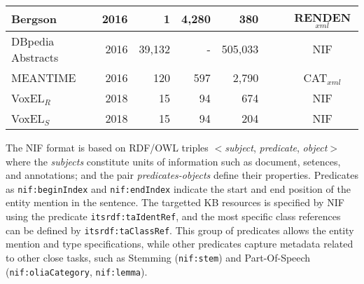 \documentclass{llncs}
\newcommand{\cmark}{\ding{51}}%
\newcommand{\xmark}{\ding{55}}%
\begin{document}
\begin{table}[tb!]
{\begin{tabular}{lrrrrccc}
Bergson~\cite{renden2016}           &2016&1       &4,280  &380     &\xmark &\cmark & RENDEN$_{xml}$\\\midrule
DBpedia Abstracts
~\cite{abstracts2016}               &2016&39,132  &-      &505,033 &\xmark &\xmark & NIF\\\midrule
MEANTIME~\cite{meantime2016}        &2016&120     &597    &2,790   &\cmark &\cmark & CAT$_{xml}$\\\midrule 
VoxEL$_R$~\cite{VoxEL2018}          &2018&15      &94     &674     &\cmark &\xmark & NIF\\\midrule  
VoxEL$_S$~\cite{VoxEL2018}          &2018&15      &94     &204     &\cmark &\xmark & NIF\\   
\bottomrule
\end{tabular}
}
\end{table}

The NIF format is based on RDF/OWL triples $<$\textit{subject}, \textit{predicate}, \textit{object}$>$ where the \textit{subjects} constitute units of information such as document, setences, and annotations; and the pair \textit{predicates-objects} define their properties. Predicates as \texttt{nif:beginIndex} and \texttt{nif:endIndex} indicate the start and end position of the entity mention in the sentence. The targetted KB resources is specified by NIF using the predicate \texttt{itsrdf:taIdentRef}, and the most specific class references can be defined by \texttt{itsrdf:taClassRef}. This group of predicates allows the entity mention and type specifications, while other predicates capture metadata related to other close tasks, such as Stemming (\texttt{nif:stem}) and Part-Of-Speech (\texttt{nif:oliaCategory}, \texttt{nif:lemma}).  









 
\end{document}
